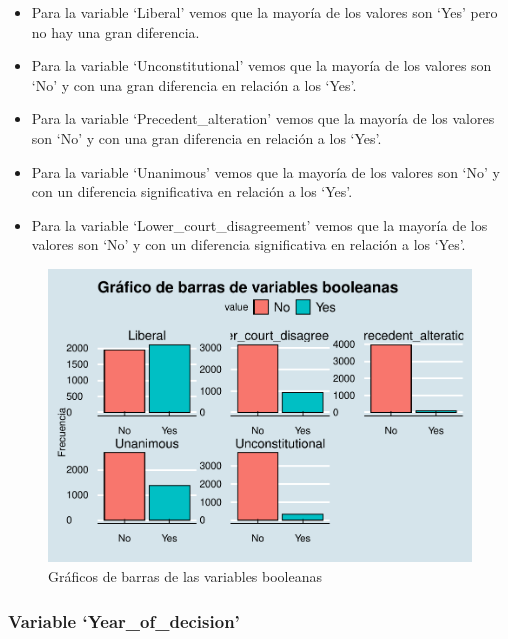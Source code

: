 \documentclass[
]{article}
\providecommand{\tightlist}{%
  \setlength{\itemsep}{0pt}\setlength{\parskip}{0pt}}
\begin{document}
\begin{itemize}
\tightlist
\item
  Para la variable `Liberal' vemos que la mayoría de los valores son
  `Yes' pero no hay una gran diferencia.
\item
  Para la variable `Unconstitutional' vemos que la mayoría de los
  valores son `No' y con una gran diferencia en relación a los `Yes'.
\item
  Para la variable `Precedent\_alteration' vemos que la mayoría de los
  valores son `No' y con una gran diferencia en relación a los `Yes'.
\item
  Para la variable `Unanimous' vemos que la mayoría de los valores son
  `No' y con un diferencia significativa en relación a los `Yes'.
\item
  Para la variable `Lower\_court\_disagreement' vemos que la mayoría de
  los valores son `No' y con un diferencia significativa en relación a
  los `Yes'.
\end{itemize}

\begin{figure}

{\centering \includegraphics[width=1\linewidth]{anacalt-regresion_files/figure-latex/bar_bool-1} 

}

\caption{ Gráficos de barras de las variables booleanas}\label{fig:bar_bool}
\end{figure}

\hypertarget{variable-year_of_decision}{%
\subsubsection{Variable
`Year\_of\_decision'}\label{variable-year_of_decision}}
\end{document}
